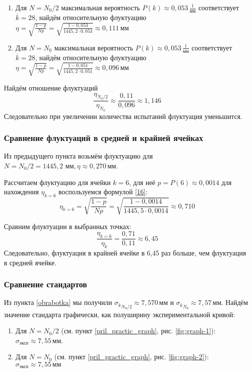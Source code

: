 \begin{enumerate}
	\item 
	{
		Для $N = N_0 / 2$ максимальная вероятность $P(k) \approx 0,053 \, \frac{1}{\text{мм}}$ соответствует $\overline{k} = 28$, найдём относительную флуктуацию $\eta = \sqrt{\frac{1 - p}{N p}} = \sqrt{\frac{1 - 0,053}{1445,2 \cdot 0,053}} \approx 0,111 \, \text{мм}$
	}
	\item 
	{
		Для $N = N_0$ максимальная вероятность $P(k) \approx 0,053 \, \frac{1}{\text{мм}}$ соответствует $\overline{k} = 28$, найдём относительную флуктуацию $\eta = \sqrt{\frac{1 - p}{N p}} = \sqrt{\frac{1 - 0,051}{1445,2 \cdot 0,051}} \approx 0,096 \, \text{мм}$
	}
\end{enumerate}

Найдём отношение флуктуаций 
\[\frac{\eta_{N_0/2}}{\eta_{N_0}} \approx \frac{0,11}{0,096} \approx 1,146\]
Следовательно при увеличении количества испытаний флуктуация уменьшится.

\subsubsection{Сравнение флуктуаций в средней и крайней ячейках}

Из предыдущего пункта возьмём флуктуацию для $N = N_0 / 2 = 1445,2 \text{ мм}, \eta \approx 0,270 \, \text{мм}$.

Рассчитаем флуктуацию для ячейки $k = 6$, для неё $ p = P(6) \approx 0,0014$ для нахождения $\eta_{k = 6}$ воспользуемся формулой \eqref{16}:
\[ \eta_{k = 6} = \sqrt{\frac{1 - p}{N p}} = \sqrt{\frac{1 - 0,0014} {1445,5 \cdot 0,0014}} \approx 0,710 \]

Сравним флуктуации в выбранных точках:
\[ \frac{\eta_{k = 6}}{\eta_{\overline{k}}} = \frac{0,71}{0,11} \approx 6,45 \]
Следовательно, флуктуация в крайней ячейке в 6,45 раз больше, чем флуктуация в средней ячейке.

\subsubsection{Сравнение стандартов}

Из пункта \ref{obrabotka} мы получили ${\sigma_k}_{N_0 / 2} \approx 7,570 \, \text{мм}$ и ${\sigma_k}_{N_0} \approx 7,57 \, \text{мм}$. Найдём значение стандарта графически, как полуширину экспериментальной кривой: 

\begin{enumerate}
	\item 
	{
		Для $N = N_0 / 2$ (см. пункт \ref{pril_practic_graph}, рис. \ref{fig:graph-1}): $\sigma_{\text{эксп}} \approx 7,55 \, \text{мм}$. 
	}
	\item 
	{
		Для $N = N_0$ (см. пункт \ref{pril_practic_graph}, рис. \ref{fig:graph-2}): $\sigma_{\text{эксп}} \approx 7,55 \, \text{мм}$
	}
\end{enumerate}

